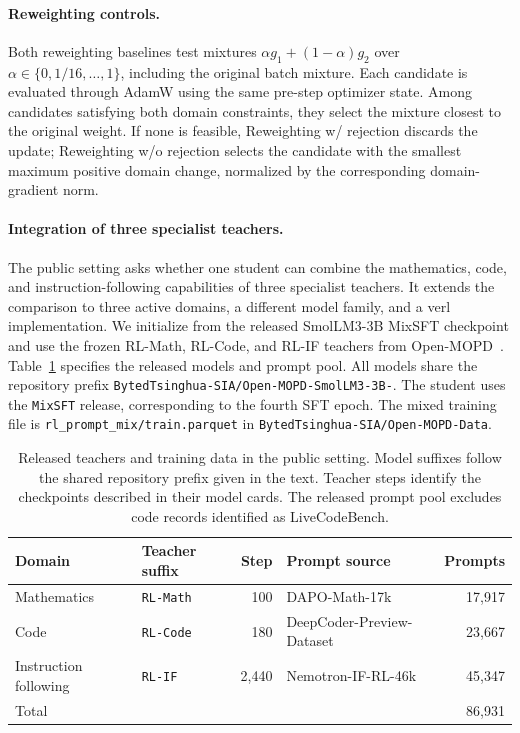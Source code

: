\documentclass{article}
\begin{document}
\paragraph{Reweighting controls.}
Both reweighting baselines test mixtures $\alpha g_1+(1-\alpha)g_2$
over $\alpha\in\{0,1/16,\ldots,1\}$, including the original batch mixture.
Each candidate is evaluated through AdamW using the same pre-step optimizer
state. Among candidates satisfying both domain constraints, they select
the mixture closest to the original weight. If none is feasible,
Reweighting w/ rejection discards the update; Reweighting w/o rejection
selects the candidate with the smallest maximum positive domain change,
normalized by the corresponding domain-gradient norm.

\paragraph{Integration of three specialist teachers.}
The public setting asks whether one student can combine the mathematics,
code, and instruction-following capabilities of three specialist teachers.
It extends the comparison to three active domains, a different model
family, and a verl implementation.
We initialize from the released SmolLM3-3B MixSFT checkpoint and use
the frozen RL-Math, RL-Code, and RL-IF teachers from Open-MOPD~\citep{ref3}.
Table~\ref{tab:public_assets} specifies the released models and prompt pool.
All models share the repository prefix
\texttt{BytedTsinghua-SIA/Open-MOPD-SmolLM3-3B-}.
The student uses the \texttt{MixSFT} release, corresponding to the fourth
SFT epoch. The mixed training file is
\texttt{rl\_prompt\_mix/train.parquet} in
\texttt{BytedTsinghua-SIA/Open-MOPD-Data}.

\begin{table}[htbp]
\centering
\small
\caption{Released teachers and training data in the public setting.
Model suffixes follow the shared repository prefix given in the text.
Teacher steps identify the checkpoints described in their model cards.
The released prompt pool excludes code records identified as LiveCodeBench.}
\label{tab:public_assets}
\begin{tabularx}{\linewidth}{@{}llrXr@{}}
\toprule
Domain & Teacher suffix & Step & Prompt source & Prompts \\
\midrule
Mathematics & \texttt{RL-Math} & 100 & DAPO-Math-17k & 17,917 \\
Code & \texttt{RL-Code} & 180 & DeepCoder-Preview-Dataset & 23,667 \\
Instruction following & \texttt{RL-IF} & 2,440 & Nemotron-IF-RL-46k & 45,347 \\
\midrule
Total & & & & 86,931 \\
\bottomrule
\end{tabularx}
\end{table}
\end{document}
